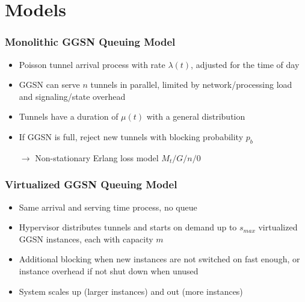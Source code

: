 \documentclass{beamer}
\begin{document}
\section{Models}


\begin{frame}
	\frametitle{Monolithic GGSN Queuing Model}
		\begin{center}
		\resizebox{!}{2.8cm}{%
			
		}
		\end{center}

		\begin{itemize}
			\item Poisson tunnel arrival process with rate $\lambda(t)$, adjusted for the time of day
			\item GGSN can serve $n$ tunnels in parallel, limited by network/processing load and signaling/state overhead
			\item Tunnels have a duration of $\mu(t)$ with a general distribution
			\item If GGSN is full, reject new tunnels with blocking probability $p_b$
			\item[$\rightarrow$] Non-stationary Erlang loss model $M_t/G/n/0$ 
		\end{itemize}

\end{frame}

\begin{frame}
	\frametitle{Virtualized GGSN Queuing Model}
		\begin{center}
		\resizebox{!}{3.8cm}{%
			
		}
		\end{center}

		\begin{itemize}
			\item Same arrival and serving time process, no queue
			\item Hypervisor distributes tunnels and starts on demand up to $s_{max}$ virtualized GGSN instances, each with capacity $m$
			\item Additional blocking when new instances are not switched on fast enough, or instance overhead if not shut down when unused
			\item System scales up (larger instances) and out (more instances)
		\end{itemize}
\end{frame}
\end{document}
